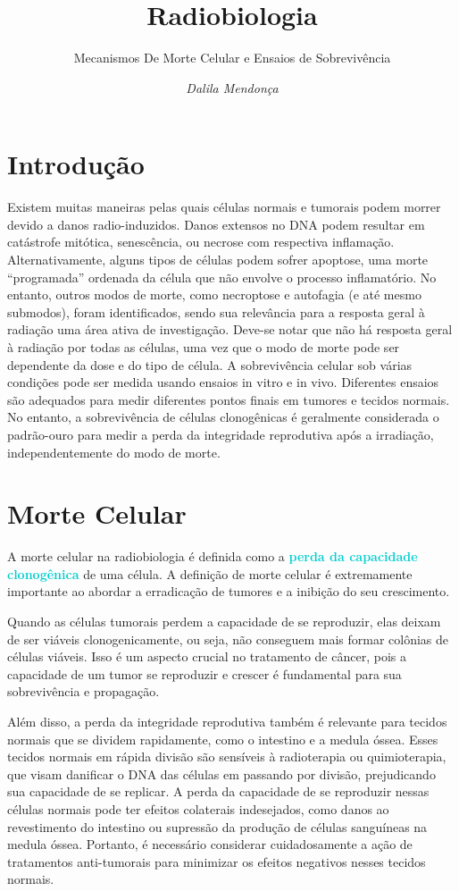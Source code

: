 \documentclass[11pt,a4paper]{article}
\title{\LobsterTwo\Huge{Radiobiologia}}
\author{\LobsterTwo\Large{Mecanismos De Morte Celular e Ensaios de Sobrevivência}\nocite{*}}
\date{\LobsterTwo\textit{Dalila Mendonça}}
\begin{document}
	\maketitle


\section{Introdução}

	Existem muitas maneiras pelas quais células normais e tumorais podem morrer devido a danos radio-induzidos. Danos extensos no DNA podem resultar em catástrofe mitótica,  senescência, ou necrose com respectiva inflamação. Alternativamente, alguns tipos de células podem sofrer apoptose, uma morte “programada” ordenada da célula que não envolve o processo inflamatório. No entanto, outros modos de morte, como necroptose e autofagia (e até mesmo submodos), foram identificados, sendo sua relevância para a resposta geral à radiação uma área ativa de investigação. Deve-se notar que não há resposta geral à radiação por todas as células, uma vez que o modo de morte pode ser dependente da dose e do tipo de célula. A sobrevivência celular sob várias condições pode ser medida usando ensaios in vitro e in vivo. Diferentes ensaios são adequados para medir diferentes pontos finais em tumores e tecidos normais. No entanto, a sobrevivência de células clonogênicas é geralmente considerada o padrão-ouro para medir a perda da integridade reprodutiva após a irradiação, independentemente do modo de morte.

\section{Morte Celular}

	A morte celular na radiobiologia é definida como a \textcolor{DarkTurquoise}{\textbf{perda da capacidade clonogênica}} de uma célula. A definição de morte celular é extremamente importante ao abordar a erradicação de tumores e a inibição do seu crescimento.
	
	Quando as células tumorais perdem a capacidade de se reproduzir, elas deixam de ser viáveis clonogenicamente, ou seja, não conseguem mais formar colônias de células viáveis. Isso é um aspecto crucial no tratamento de câncer, pois a capacidade de um tumor se reproduzir e crescer é fundamental para sua sobrevivência e propagação.

	Além disso, a perda da integridade reprodutiva também é relevante para tecidos normais que se dividem rapidamente, como o intestino e a medula óssea. Esses tecidos normais em rápida divisão são sensíveis à radioterapia ou quimioterapia, que visam danificar o DNA das células em passando por divisão, prejudicando sua capacidade de se replicar. A perda da capacidade de se reproduzir nessas células normais pode ter efeitos colaterais indesejados, como danos ao revestimento do intestino ou supressão da produção de células sanguíneas na medula óssea. Portanto, é necessário considerar cuidadosamente a ação de tratamentos anti-tumorais para minimizar os efeitos negativos nesses tecidos normais.
\end{document}
